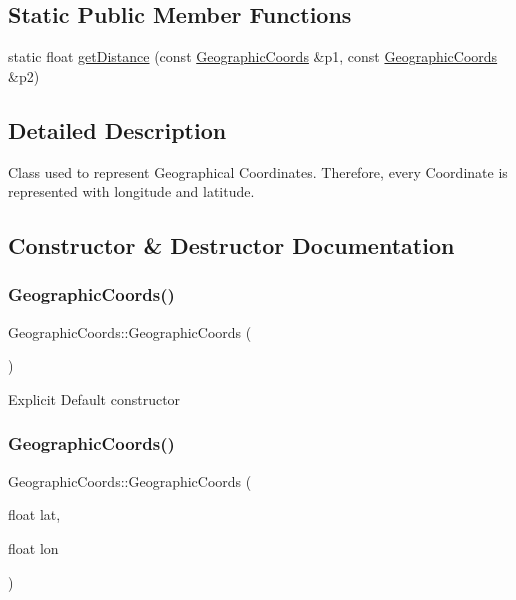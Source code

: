 \subsection*{Static Public Member Functions}
\begin{DoxyCompactItemize}
\item 
static float \hyperlink{class_geographic_coords_a25f3ba7791c305b8620bb0ef8adac156}{get\+Distance} (const \hyperlink{class_geographic_coords}{Geographic\+Coords} \&p1, const \hyperlink{class_geographic_coords}{Geographic\+Coords} \&p2)
\end{DoxyCompactItemize}


\subsection{Detailed Description}
Class used to represent Geographical Coordinates. Therefore, every Coordinate is represented with longitude and latitude. 

\subsection{Constructor \& Destructor Documentation}
\hypertarget{class_geographic_coords_a6e58da78d507551dc7a6c39e6ffb33b3}{}\label{class_geographic_coords_a6e58da78d507551dc7a6c39e6ffb33b3} 
\subsubsection{\texorpdfstring{Geographic\+Coords()}{GeographicCoords()}\hspace{0.1cm}{\footnotesize\ttfamily [1/2]}}
{\footnotesize\ttfamily Geographic\+Coords\+::\+Geographic\+Coords (\begin{DoxyParamCaption}{ }\end{DoxyParamCaption})\hspace{0.3cm}{\ttfamily [default]}}

Explicit Default constructor \hypertarget{class_geographic_coords_a5db8168e8754a1eb2d13e3d2c8318cb4}{}\label{class_geographic_coords_a5db8168e8754a1eb2d13e3d2c8318cb4} 
\subsubsection{\texorpdfstring{Geographic\+Coords()}{GeographicCoords()}\hspace{0.1cm}{\footnotesize\ttfamily [2/2]}}
{\footnotesize\ttfamily Geographic\+Coords\+::\+Geographic\+Coords (\begin{DoxyParamCaption}\item[{float}]{lat,  }\item[{float}]{lon }\end{DoxyParamCaption})}


